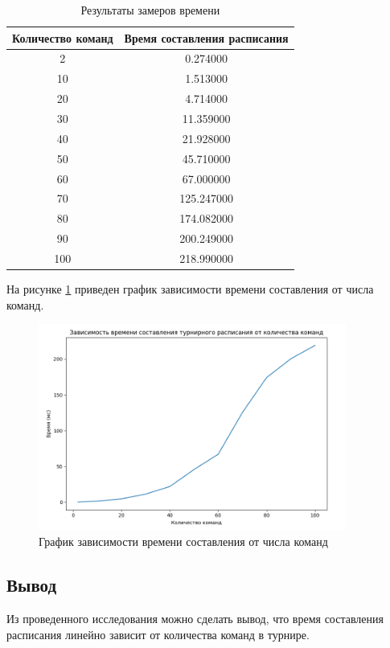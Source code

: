 \begin{table}[H]
	\begin{center}
		\caption{Результаты замеров времени}
		\begin{tabular}{|c|c|}
			\hline
			Количество команд & Время составления расписания \\
			\hline
			2 & 0.274000 \\
			\hline
			10 & 1.513000 \\
			\hline			
			20 & 4.714000 \\
			\hline			
			30 & 11.359000 \\
			\hline			
			40 & 21.928000 \\
			\hline			
			50 & 45.710000 \\
			\hline			
			60 & 67.000000 \\
			\hline			
			70 & 125.247000 \\
			\hline			
			80 & 174.082000 \\
			\hline			
			90 & 200.249000 \\
			\hline			
			100 & 218.990000 \\
			\hline			
		\end{tabular}
		\label{table:time}
	\end{center}
\end{table}

На рисунке \ref{fig:research} приведен график зависимости времени составления от числа команд.
\begin{figure}[h]
	\centering
	\includegraphics[width=0.9\textwidth]{img/research.png}
	\caption{График зависимости времени составления от числа команд}
	\label{fig:research}
\end{figure}

\subsection*{Вывод}
Из проведенного исследования можно сделать вывод, что время составления расписания линейно зависит от количества команд в турнире.